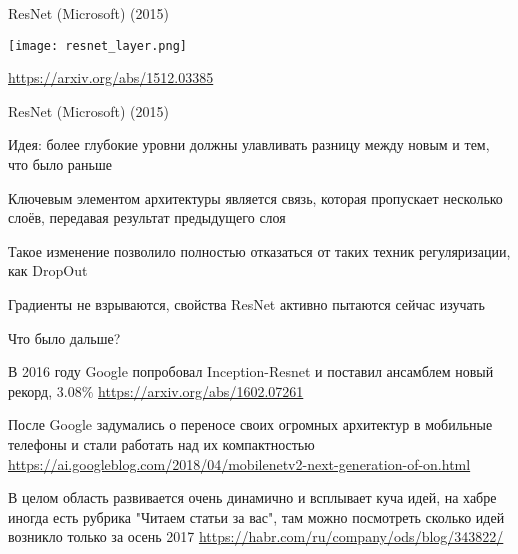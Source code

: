 \documentclass[notes,12pt, aspectratio=169]{beamer}
\newenvironment{wideitemize}{\itemize\addtolength{\itemsep}{10pt}}{\enditemize}
\begin{document}
\begin{frame}{ResNet (Microsoft) (2015)}
\begin{center}
\texttt{[image: resnet\_layer.png]}
\end{center}
\vfill %
\footnotesize
\color{blue} \url{https://arxiv.org/abs/1512.03385}
\end{frame}



\begin{frame}{ResNet (Microsoft) (2015)}
\begin{wideitemize}
\item \alert{Идея:} более глубокие уровни должны улавливать разницу между новым и тем, что было раньше 

\item Ключевым элементом архитектуры является связь, которая пропускает несколько слоёв, передавая результат предыдущего слоя

\item Такое изменение позволило полностью отказаться от таких техник регуляризации, как DropOut

\item Градиенты не взрываются, свойства ResNet активно пытаются сейчас изучать
\end{wideitemize}
\end{frame}


\begin{frame}{Что было дальше?}
\begin{wideitemize}
\item  В  2016 году Google попробовал Inception-Resnet и поставил ансамблем новый рекорд, $3.08\%$ 
\vfill
{\color{blue} \url{https://arxiv.org/abs/1602.07261}}

\vfill
\item После Google задумались о переносе своих огромных архитектур в мобильные телефоны и стали работать над их компактностью 
\vfill 
{\color{blue} \url{https://ai.googleblog.com/2018/04/mobilenetv2-next-generation-of-on.html}}

\vfill 
\item  В целом область развивается очень динамично и всплывает куча идей, на хабре иногда есть рубрика "Читаем статьи за вас", там можно посмотреть сколько идей возникло только за осень 2017
\vfill
{\color{blue} \url{https://habr.com/ru/company/ods/blog/343822/}}	
\end{wideitemize}
\end{frame}
\end{document}
